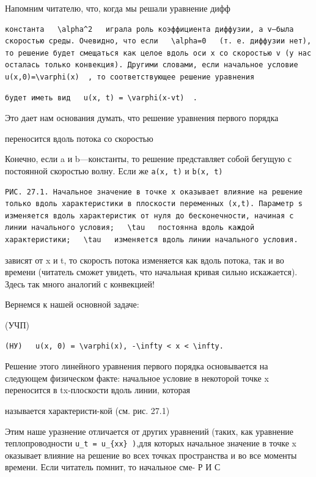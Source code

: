 \documentclass[
  ukrainian,
]{article}
\begin{document}
Напомним читателю, что, когда мы решали уравнение дифф

\begin{verbatim}
константа   \alpha^2   играла роль коэффициента диффузии, а v—была скоростью среды. Очевидно, что если   \alpha=0   (т. е. диффузии нет), то решение будет смещаться как целое вдоль оси x со скоростью v (у нас осталась только конвекция). Другими словами, если начальное условие   u(x,0)=\varphi(x)  , то соответствующее решение уравнения
\end{verbatim}

\begin{verbatim}
будет иметь вид   u(x, t) = \varphi(x-vt)  .
\end{verbatim}

Это дает нам основания думать, что решение уравнения первого порядка

переносится вдоль потока со скоростью

Конечно, если a и b---константы, то решение представляет собой бегущую с
постоянной скоростью волну. Если же \texttt{a(x,\ t)} и
\texttt{b(x,\ t)}

\begin{verbatim}
РИС. 27.1. Начальное значение в точке x оказывает влияние на решение только вдоль характеристики в плоскости переменных (x,t). Параметр s изменяется вдоль характеристик от нуля до бесконечности, начиная с линии начального условия;   \tau   постоянна вдоль каждой характеристики;   \tau   изменяется вдоль линии начального условия.
\end{verbatim}

зависят от x и t, то скорость потока изменяется как вдоль потока, так и
во времени (читатель сможет увидеть, что начальная кривая сильно
искажается). Здесь так много аналогий с конвекцией!

Вернемся к нашей основной задаче:

(УЧП)

\begin{verbatim}
(НУ)   u(x, 0) = \varphi(x), -\infty < x < \infty.
\end{verbatim}

Решение этого линейного уравнения первого порядка основывается на
следующем физическом факте: начальное условие в некоторой точке x
переносится в tx-плоскости вдоль линии, которая

называется характеристи-кой (см. рис. 27.1)

Этим наше уразнение отличается от других уравнений (таких, как уравнение
теплопроводности \texttt{u\_t\ =\ u\_\{xx\}\ )},для которых начальное
значение в точке x оказывает влияние на решение во всех точках
пространства и во все моменты времени. Если читатель помнит, то
начальное сме- Р И С
\end{document}
